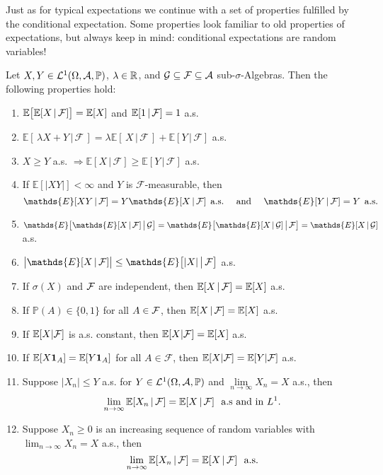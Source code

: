 Just as for typical expectations we continue with a set of properties fulfilled by the conditional expectation. Some properties look familiar to old properties of expectations, but always keep in mind: conditional expectations are random variables! 

\begin{lsatzwichtig}
\begin{theorem}\label{cond_properties}
	Let $X,Y\in\mathcal{L}^1(\Omega,\mathcal{A},\mathbb{P})$, $\lambda\in \mathbb{R}$, and $\mathcal{G}\subseteq\mathcal{F}\subseteq\mathcal{A}$ sub-$\sigma$-Algebras. Then the following properties hold:
		\begin{enumerate}[label=(\roman*)]
			\item $\mathbb{E}\big[\mathbb{E}[X\,|\,\mathcal F]\big]=\mathbb{E}[X]$ and  $\mathbb{E}[1\,|\, \mathcal F]=1$ a.s.
			\item $\mathds{E}[\,\lambda X+Y \,|\, \mathcal{F}\,]=\lambda\mathds{E}[\, X \, | \, \mathcal{F}\, ]+\mathds{E}[Y \, | \, \mathcal{F}]$ a.s.
			\item $X \geq Y$ a.s. $\Rightarrow \mathds{E}[X\, |\, \mathcal{F}] \geq \mathds{E}[Y \,|\, \mathcal{F}]$ a.s.
			\item If $\mathds{E}[\lvert XY \rvert] < \infty$ and $Y$ is $\mathcal{F}$-measurable, then
				$$\mathds{E}[XY\,|\,\cF] = Y\mathds{E}[X\,|\,\cF]\:\:\text{a.s.}\quad \text{ and }\quad \mathds{E}[Y\,|\,\cF]=Y\:\:\text{a.s.}$$
			\item $\mathds{E}\big[\mathds{E}[X\,|\,\cF]\,\big|\,\cG\big] = \mathds{E}\big[\mathds{E}[X\,|\,\cG]\,\big|\,\cF\big]=\mathds{E}[X\,|\,\cG]$ a.s.
			\item $\big\lvert\mathds{E}[X\,|\,\cF]\big\rvert \leq \mathds{E}\big[\lvert X \rvert\,\big|\,\cF\big]$ a.s.
			\item If $\sigma(X)$ and $\mathcal{F}$ are independent, then $\mathbb E[X\,|\,\mathcal{F}] = \mathbb E[X]$ a.s.
			\item If $\mathbb{P}(A)\in \{0,1\}$ for all $A \in \mathcal{F}$, then $\mathbb E[X\,|\,\mathcal{F}] = \mathbb E[X]$ a.s.
			\item If $\mathbb{E}[X|\mathcal F]$ is a.s. constant, then $\mathbb{E}[X|\mathcal F]=\mathbb{E}[X]$ a.s.
			\item If $\mathbb{E}[X\mathbf 1_A]=\mathbb{E}[Y\mathbf 1_A]$ for all $A\in \mathcal F$, then $\mathbb{E}[X|\mathcal F]=\mathbb{E}[Y|\mathcal F]$ a.s.
			\item Suppose $\lvert X_n \rvert \leq Y$ a.s. for $Y \in \mathcal{L}^1(\Omega, \mathcal A, \mathbb P)$ and $\lim\limits_{n \to \infty}X_n = X$ a.s., then
				$$\lim\limits_{n \to \infty}{ \mathbb E[X_n\,|\,\mathcal{F}]}=\mathbb E[X\,|\,\mathcal{F}] \,\,\text{ a.s and in }L^1.$$ 
			\item Suppose $X_n\geq 0$ is an increasing sequence of random variables with $\lim_{n\to\infty} X_n=X$ a.s., then 
				$$\lim\limits_{n \to \infty}{ \mathbb E[X_n\,|\,\mathcal{F}]}=\mathbb E[X\,|\,\mathcal{F}] \,\,\text{ a.s}.$$ 			
				
	\end{enumerate}
\end{theorem}
\end{lsatzwichtig}
